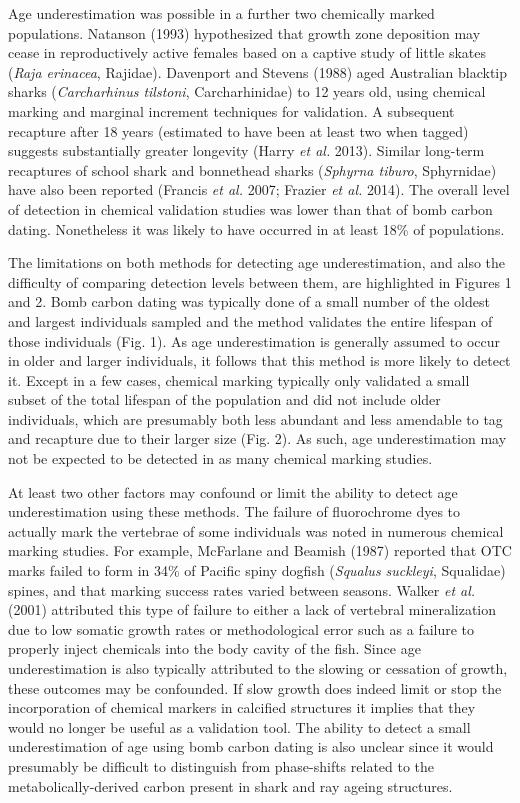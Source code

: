 \documentclass[]{article}
\begin{document}
Age underestimation was possible in a further two chemically marked
populations. Natanson (1993) hypothesized that growth zone deposition
may cease in reproductively active females based on a captive study of
little skates (\emph{Raja erinacea}, Rajidae). Davenport and Stevens
(1988) aged Australian blacktip sharks (\emph{Carcharhinus tilstoni},
Carcharhinidae) to 12 years old, using chemical marking and marginal
increment techniques for validation. A subsequent recapture after 18
years (estimated to have been at least two when tagged) suggests
substantially greater longevity (Harry \emph{et al.} 2013). Similar
long-term recaptures of school shark and bonnethead sharks
(\emph{Sphyrna tiburo}, Sphyrnidae) have also been reported (Francis
\emph{et al.} 2007; Frazier \emph{et al.} 2014). The overall level of
detection in chemical validation studies was lower than that of bomb
carbon dating. Nonetheless it was likely to have occurred in at least
18\% of populations.

The limitations on both methods for detecting age underestimation, and
also the difficulty of comparing detection levels between them, are
highlighted in Figures 1 and 2. Bomb carbon dating was typically done of
a small number of the oldest and largest individuals sampled and the
method validates the entire lifespan of those individuals (Fig. 1). As
age underestimation is generally assumed to occur in older and larger
individuals, it follows that this method is more likely to detect it.
Except in a few cases, chemical marking typically only validated a small
subset of the total lifespan of the population and did not include older
individuals, which are presumably both less abundant and less amendable
to tag and recapture due to their larger size (Fig. 2). As such, age
underestimation may not be expected to be detected in as many chemical
marking studies.

At least two other factors may confound or limit the ability to detect
age underestimation using these methods. The failure of fluorochrome
dyes to actually mark the vertebrae of some individuals was noted in
numerous chemical marking studies. For example, McFarlane and Beamish
(1987) reported that OTC marks failed to form in 34\% of Pacific spiny
dogfish (\emph{Squalus suckleyi}, Squalidae) spines, and that marking
success rates varied between seasons. Walker \emph{et al.} (2001)
attributed this type of failure to either a lack of vertebral
mineralization due to low somatic growth rates or methodological error
such as a failure to properly inject chemicals into the body cavity of
the fish. Since age underestimation is also typically attributed to the
slowing or cessation of growth, these outcomes may be confounded. If
slow growth does indeed limit or stop the incorporation of chemical
markers in calcified structures it implies that they would no longer be
useful as a validation tool. The ability to detect a small
underestimation of age using bomb carbon dating is also unclear since it
would presumably be difficult to distinguish from phase-shifts related
to the metabolically-derived carbon present in shark and ray ageing
structures.
\end{document}
